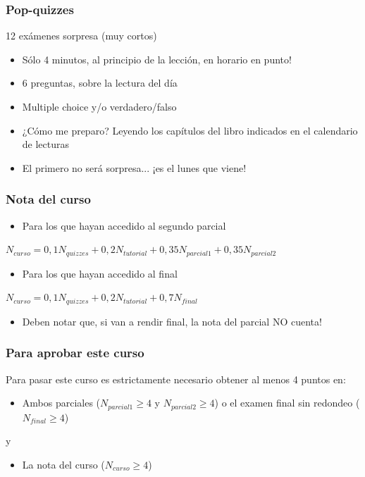 \documentclass{beamer}
\begin{document}
\begin{frame}
\frametitle{Pop-quizzes}
12 exámenes sorpresa (muy cortos) \vspace{2mm}
\begin{itemize}
    \item Sólo 4 minutos, al principio de la lección, en horario en punto!
    \item 6 preguntas, sobre la lectura del día
    \item Multiple choice y/o verdadero/falso
    \item ¿Cómo me preparo? Leyendo los capítulos del libro indicados en el calendario de lecturas
    \item El primero no será sorpresa... ¡es el lunes que viene!
\end{itemize}
\end{frame}

\begin{frame}
\frametitle{Nota del curso}
\small
\begin{itemize}
    \item Para los que hayan accedido al segundo parcial \\
\end{itemize}
\begin{center}
 {$N_{curso}=0,1N_{quizzes}+0,2N_{tutorial}+0,35N_{parcial 1}+0,35N_{parcial 2}$}   
\end{center}

\begin{itemize}
    \item Para los que hayan accedido al final
\end{itemize}
\begin{center}
  {$N_{curso}=0,1N_{quizzes}+0,2N_{tutorial}+0,7N_{final}$}   
\end{center}

\begin{itemize}    
    \item Deben notar que, si van a rendir final, la nota del parcial NO cuenta!
\end{itemize}
\end{frame}

\begin{frame}
\frametitle{Para aprobar este curso}
Para pasar este curso es estrictamente necesario obtener al menos 4 puntos en:
\vspace{2mm}
\begin{itemize}
    \item Ambos parciales ($N_{parcial 1} \geq 4$ y $N_{parcial 2} \geq 4$) o el examen final sin redondeo ($N_{final} \geq 4$)
\end{itemize}
\centering y
\vspace{2mm}
\begin{itemize}
    \item La nota del curso ($N_{curso} \geq 4$)
\end{itemize}
\end{frame}
\end{document}
